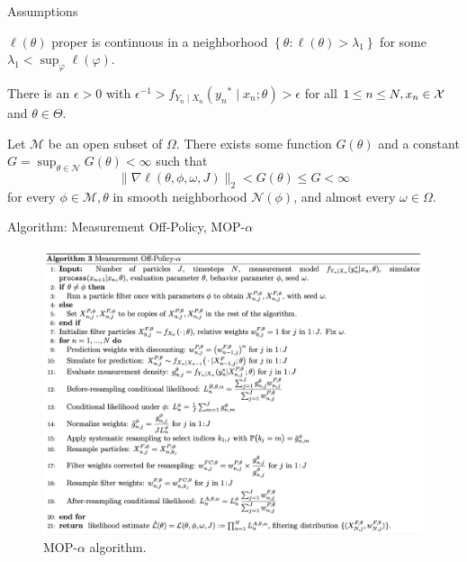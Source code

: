 \documentclass{beamer}
\begin{document}
\begin{frame}{Assumptions}
    
    \begin{aspt} $\ell(\theta)$ proper is continuous in a neighborhood $\left\{\theta: \ell(\theta)>\lambda_1\right\}$ for some $\lambda_1<\sup _{\varphi} \ell(\varphi)$.
    \end{aspt}
    \pause 
    \begin{aspt} There is an $\epsilon>0$ with $\epsilon^{-1}>f_{Y_n \mid X_n}\left(y_n{ }^* \mid x_n; \theta\right)>\epsilon$ for all $1 \leq n \leq N, x_n \in {\mathcal{X}}$ and $\theta \in \Theta.$
    \end{aspt}
    \pause 
    \begin{aspt}
    \label{assump:local-bounded-derivative}
    Let $\mathcal{M}$ be an open subset of $\Omega$. There exists some function $G(\theta)$ and a constant $G=\sup _{\theta \in \mathcal{N}} G(\theta)<\infty$ such that
        $$
        \|\nabla \ell(\theta, \phi, \omega, J)\|_2<G(\theta) \leq G<\infty
        $$
        for every $\phi \in \mathcal{M}, \theta$ in smooth neighborhood $\mathcal{N}(\phi)$, and almost every $\omega \in \Omega$.
    \end{aspt}
\end{frame}


\begin{frame}{Algorithm: Measurement Off-Policy, MOP-$\alpha$}
    \begin{figure}
        \centering
        \includegraphics[scale=0.4]{imgs/mop.png}
        \caption{MOP-$\alpha$ algorithm.}
        \label{fig:mop}
    \end{figure}
\end{frame}
\end{document}
